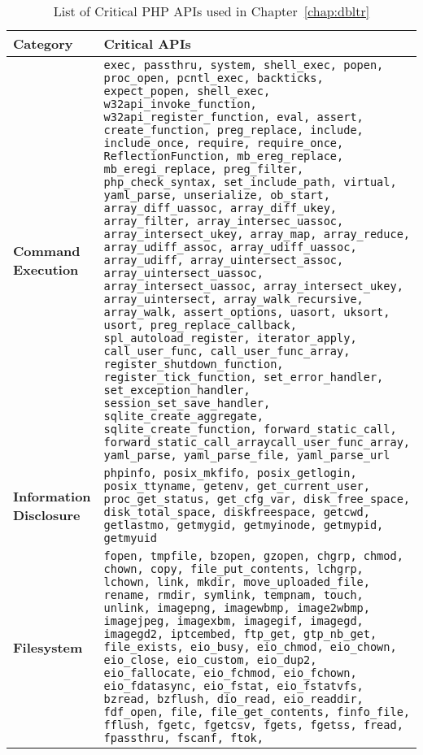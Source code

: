 \begin{table}[t]
\caption{List of Critical PHP APIs used in Chapter~\ref{chap:dbltr}}
\label{tab:cacs}
\begin{adjustbox}{max width=\textwidth}
\begin{tabular}{|l|p{20cm}|}
\hline
    \textbf{Category}               & \textbf{Critical APIs} \\ \hline 
    \textbf{Command Execution} & \texttt{exec, passthru,
    system, shell\_exec, popen, proc\_open, pcntl\_exec, backticks, expect\_popen, shell\_exec, w32api\_invoke\_function, w32api\_register\_function, eval, assert, create\_function, preg\_replace, include, include\_once, require, require\_once, ReflectionFunction, mb\_ereg\_replace, mb\_eregi\_replace, preg\_filter, php\_check\_syntax, set\_include\_path, virtual, yaml\_parse, unserialize, ob\_start, array\_diff\_uassoc, array\_diff\_ukey, array\_filter, array\_intersec\_uassoc, array\_intersect\_ukey, array\_map,
    array\_reduce, array\_udiff\_assoc, array\_udiff\_uassoc, array\_udiff, array\_uintersect\_assoc, array\_uintersect\_uassoc, array\_intersect\_uassoc, array\_intersect\_ukey, array\_uintersect, array\_walk\_recursive, 
    array\_walk, assert\_options, uasort, uksort, usort, preg\_replace\_callback, spl\_autoload\_register, iterator\_apply, call\_user\_func, call\_user\_func\_array, 
    register\_shutdown\_function, register\_tick\_function, set\_error\_handler, set\_exception\_handler, session\_set\_save\_handler, sqlite\_create\_aggregate, sqlite\_create\_function, forward\_static\_call, forward\_static\_call\_arraycall\_user\_func\_array,
    yaml\_parse, yaml\_parse\_file, yaml\_parse\_url}
    \\ \hline
    \textbf{Information Disclosure} & \texttt{phpinfo, posix\_mkfifo, posix\_getlogin, posix\_ttyname, getenv, get\_current\_user, proc\_get\_status, get\_cfg\_var, disk\_free\_space, 
    disk\_total\_space, diskfreespace, getcwd, getlastmo, getmygid, getmyinode, getmypid, getmyuid} \\ \hline 
    \textbf{Filesystem} & \texttt{fopen, tmpfile, bzopen, gzopen, chgrp, chmod, chown, copy, file\_put\_contents, lchgrp, lchown, link, mkdir, move\_uploaded\_file, 
    rename, rmdir, symlink, tempnam, touch, unlink, imagepng, imagewbmp, image2wbmp, imagejpeg, imagexbm, imagegif, imagegd, imagegd2, iptcembed, 
    ftp\_get, gtp\_nb\_get, file\_exists, eio\_busy, eio\_chmod, eio\_chown, eio\_close, eio\_custom, eio\_dup2, eio\_fallocate, eio\_fchmod, eio\_fchown, eio\_fdatasync, eio\_fstat, eio\_fstatvfs,
    bzread, bzflush, dio\_read, eio\_readdir, fdf\_open, file, file\_get\_contents, finfo\_file, fflush, fgetc, fgetcsv, fgets, fgetss, fread, fpassthru, fscanf, ftok,
}
\end{tabular}
\end{adjustbox}
\end{table}
